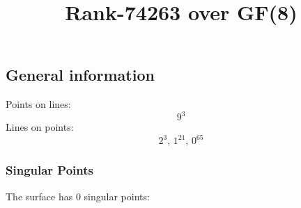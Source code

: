 \documentclass{article}
\newcommand\setTBstruts{\def\T{\rule{0pt}{2.6ex}}%
\def\B{\rule[-1.2ex]{0pt}{0pt}}}
\begin{document}
 
\setTBstruts



{\allowdisplaybreaks%






\title{Rank-74263 over GF(8)}
\author{}%
\maketitle%
%
{}



\subsection*{General information}
Points on lines:
$$
9^3$$
Lines on points:
$$
2^3,\,1^{21},\,0^{65}$$
\subsubsection*{Singular Points}
The surface has 0 singular points:\\
\begin{align*}
\end{align*}
}
\end{document}
